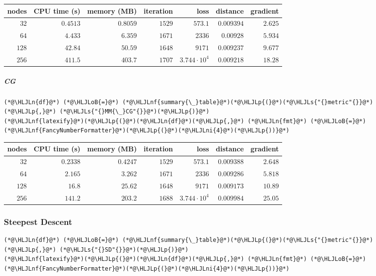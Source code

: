 \documentclass[12pt,a4paper]{article}
\newcommand{\HLJLn}[1]{#1}
\newcommand{\HLJLnf}[1]{\textcolor[RGB]{66,102,213}{#1}}
\newcommand{\HLJLs}[1]{\textcolor[RGB]{201,61,57}{#1}}
\newcommand{\HLJLni}[1]{\textcolor[RGB]{59,151,46}{#1}}
\newcommand{\HLJLoB}[1]{\textcolor[RGB]{102,102,102}{\textbf{#1}}}
\newcommand{\HLJLp}[1]{#1}
\begin{document}
\begin{tabular}
{r | r | r | r | r | r | r}
nodes & CPU time (s) & memory (MB) & iteration & loss & distance & gradient \\
\hline
$32$ & $0.4513$ & $0.8059$ & $1529$ & $573.1$ & $0.009394$ & $2.625$ \\
$64$ & $4.433$ & $6.359$ & $1671$ & $2336$ & $0.00928$ & $5.934$ \\
$128$ & $42.84$ & $50.59$ & $1648$ & $9171$ & $0.009237$ & $9.677$ \\
$256$ & $411.5$ & $403.7$ & $1707$ & $3.744 \cdot 10^{4}$ & $0.009218$ & $18.28$ \\
\end{tabular}


\subparagraph{CG}

\begin{lstlisting}
(*@\HLJLn{df}@*) (*@\HLJLoB{=}@*) (*@\HLJLnf{summary{\_}table}@*)(*@\HLJLp{(}@*)(*@\HLJLs{"{}metric"{}}@*)(*@\HLJLp{,}@*) (*@\HLJLs{"{}MM{\_}CG"{}}@*)(*@\HLJLp{)}@*)
(*@\HLJLnf{latexify}@*)(*@\HLJLp{(}@*)(*@\HLJLn{df}@*)(*@\HLJLp{,}@*) (*@\HLJLn{fmt}@*) (*@\HLJLoB{=}@*) (*@\HLJLnf{FancyNumberFormatter}@*)(*@\HLJLp{(}@*)(*@\HLJLni{4}@*)(*@\HLJLp{))}@*)
\end{lstlisting}


\begin{tabular}
{r | r | r | r | r | r | r}
nodes & CPU time (s) & memory (MB) & iteration & loss & distance & gradient \\
\hline
$32$ & $0.2338$ & $0.4247$ & $1529$ & $573.1$ & $0.009388$ & $2.648$ \\
$64$ & $2.165$ & $3.262$ & $1671$ & $2336$ & $0.009286$ & $5.818$ \\
$128$ & $16.8$ & $25.62$ & $1648$ & $9171$ & $0.009173$ & $10.89$ \\
$256$ & $141.2$ & $203.2$ & $1688$ & $3.744 \cdot 10^{4}$ & $0.009984$ & $25.05$ \\
\end{tabular}


\subsubsection{Steepest Descent}

\begin{lstlisting}
(*@\HLJLn{df}@*) (*@\HLJLoB{=}@*) (*@\HLJLnf{summary{\_}table}@*)(*@\HLJLp{(}@*)(*@\HLJLs{"{}metric"{}}@*)(*@\HLJLp{,}@*) (*@\HLJLs{"{}SD"{}}@*)(*@\HLJLp{)}@*)
(*@\HLJLnf{latexify}@*)(*@\HLJLp{(}@*)(*@\HLJLn{df}@*)(*@\HLJLp{,}@*) (*@\HLJLn{fmt}@*) (*@\HLJLoB{=}@*) (*@\HLJLnf{FancyNumberFormatter}@*)(*@\HLJLp{(}@*)(*@\HLJLni{4}@*)(*@\HLJLp{))}@*)
\end{lstlisting}
\end{document}
